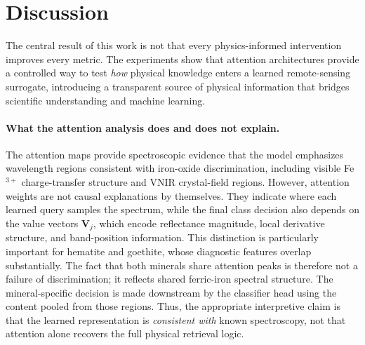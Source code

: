 \documentclass[11pt]{article}
\begin{document}
\section{Discussion}

The central result of this work is not that every physics-informed intervention improves every metric.
The experiments show that attention architectures provide a controlled way to test \emph{how} physical knowledge enters a learned remote-sensing surrogate, introducing a transparent source of physical information that bridges scientific understanding and machine learning.

\paragraph{What the attention analysis does and does not explain.}
The attention maps provide spectroscopic evidence that the model emphasizes wavelength regions consistent with iron-oxide discrimination, including visible Fe$^{3+}$ charge-transfer structure and VNIR crystal-field regions. 
However, attention weights are not causal explanations by themselves. 
They indicate where each learned query samples the spectrum, while the final class decision also depends on the value vectors $\mathbf{V}_j$, which encode reflectance magnitude, local derivative structure, and band-position information. 
This distinction is particularly important for hematite and goethite, whose diagnostic features overlap substantially. 
The fact that both minerals share attention peaks is therefore not a failure of discrimination; it reflects shared ferric-iron spectral structure. 
The mineral-specific decision is made downstream by the classifier head using the content pooled from those regions. 
Thus, the appropriate interpretive claim is that the learned representation is \emph{consistent with} known spectroscopy, not that attention alone recovers the full physical retrieval logic.
\end{document}
